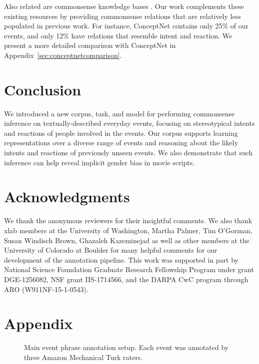 \documentclass[11pt,a4paper]{article}
\begin{document}
Also related are commonsense knowledge bases 
\cite{OpenMindCommonsense,ConceptNet}. Our work complements these existing resources by providing commonsense relations that are relatively less populated in previous work.
For instance, ConceptNet contains only 25\% of our events, and only 12\% have relations that resemble intent and reaction.
We present a more detailed comparison with ConceptNet in Appendix~\ref{sec:conceptnetcomparison}.
 
\section{Conclusion}
We introduced a new corpus, task, and model for performing commonsense inference on textually-described everyday events, focusing on stereotypical intents and reactions of people involved in the events. Our corpus supports learning representations over a diverse range of events and reasoning about the likely intents and reactions of previously unseen events. We also demonstrate that such inference can help reveal 
implicit gender bias in movie scripts. 


\section*{Acknowledgments}
We thank the anonymous reviewers for their insightful comments. 
We also thank xlab members at the University of Washington, Martha Palmer, Tim O'Gorman, Susan Windisch Brown, Ghazaleh Kazeminejad as well as other members at the University of Colorado at Boulder for many helpful comments for our development of the annotation pipeline. 
This work was supported in part by
National Science Foundation Graduate Research Fellowship Program under
grant DGE-1256082, NSF grant IIS-1714566, 
and the DARPA CwC program through ARO (W911NF-15-1-0543).




\clearpage
\appendix
\section{Appendix}
\begin{figure*}[!htb]
    \centering
    \caption{Main event phrase annotation setup. Each event was annotated by three Amazon Mechanical Turk raters.
    \label{fig:mturkSetup}}
\end{figure*}
\end{document}

